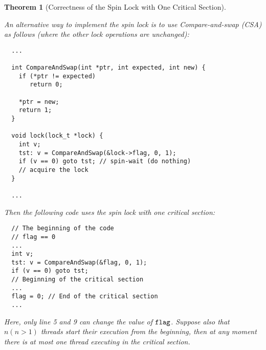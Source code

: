 \documentclass{article}[10pt]
\newtheorem{mythm}[mydef]{Theorem}
\newcommand{\kwd}[1]{\ensuremath{\text{\ttfamily #1}}\xspace}
\def\kflag{\kwd{flag}}
\begin{document}
\begin{mythm}[Correctness of the Spin Lock with One Critical Section]
\label{thm:spin-lock-correct-cas}

An alternative way to implement the spin lock is to use
Compare-and-swap (CSA) as follows (where the other lock operations are
unchanged):
%
\begin{lstlisting}
  ...

  int CompareAndSwap(int *ptr, int expected, int new) {
    if (*ptr != expected)
       return 0;
      
    *ptr = new;
    return 1;
  }

  void lock(lock_t *lock) {
    int v;
    tst: v = CompareAndSwap(&lock->flag, 0, 1);
    if (v == 0) goto tst; // spin-wait (do nothing)
    // acquire the lock
  }

  ...
\end{lstlisting}
%
Then the following code uses the spin lock with one critical section:
%
\begin{lstlisting}
  // The beginning of the code
  // flag == 0
  ...
  int v;
  tst: v = CompareAndSwap(&flag, 0, 1);
  if (v == 0) goto tst;
  // Beginning of the critical section
  ...
  flag = 0; // End of the critical section
  ...
\end{lstlisting}
%
Here, only line 5 and 9 can change the value of \kflag.
%
Suppose also that $n (n > 1)$ threads start their execution from the
beginning, then at any moment there is at most one thread executing in
the critical section.
\end{mythm}
%
\end{document}
